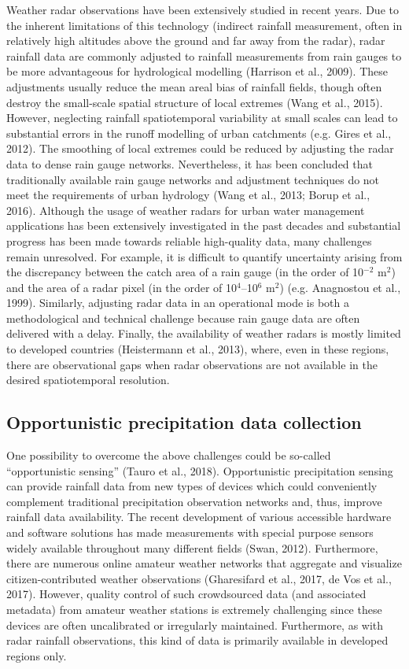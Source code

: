 \documentclass{ctuthesis}\usepackage[]{graphicx}\usepackage[]{color}
\begin{document}
Weather radar observations have been extensively studied in recent years. Due to the inherent limitations of this technology (indirect rainfall measurement, often in relatively high altitudes above the ground and far away from the radar), radar rainfall data are commonly adjusted to rainfall measurements from rain gauges to be more advantageous for hydrological modelling (Harrison et al., 2009). These adjustments usually reduce the mean areal bias of rainfall fields, though often destroy the small-scale spatial structure of local extremes (Wang et al., 2015). However, neglecting rainfall spatiotemporal variability at small scales can lead to substantial errors in the runoff modelling of urban catchments (e.g. Gires et al., 2012). The smoothing of local extremes could be reduced by adjusting the radar data to dense rain gauge networks. Nevertheless, it has been concluded that traditionally available rain gauge networks and adjustment techniques do not meet the requirements of urban hydrology (Wang et al., 2013; Borup et al., 2016). Although the usage of weather radars for urban water management applications has been extensively investigated in the past decades and substantial progress has been made towards reliable high-quality data, many challenges remain unresolved. For example, it is difficult to quantify uncertainty arising from the discrepancy between the catch area of a rain gauge (in the order of 10$^{-2}$ m$^2$) and the area of a radar pixel (in the order of 10$^4$--10$^6$ m$^2$) (e.g. Anagnostou et al., 1999). Similarly, adjusting radar data in an operational mode is both a methodological and technical challenge because rain gauge data are often delivered with a delay. Finally, the availability of weather radars is mostly limited to developed countries (Heistermann et al., 2013), where, even in these regions, there are observational gaps when radar observations are not available in the desired spatiotemporal resolution.


\subsection{Opportunistic precipitation data collection}

One possibility to overcome the above challenges could be so-called \enquote{opportunistic sensing} (Tauro et al., 2018). Opportunistic precipitation sensing can provide rainfall data from new types of devices which could conveniently complement traditional precipitation observation networks and, thus, improve rainfall data availability. The recent development of various accessible hardware and software solutions has made measurements with special purpose sensors widely available throughout many different fields (Swan, 2012). Furthermore, there are numerous online amateur weather networks that aggregate and visualize citizen-contributed weather observations (Gharesifard et al., 2017, de Vos et al., 2017). However, quality control of such crowdsourced data (and associated metadata) from amateur weather stations is extremely challenging since these devices are often uncalibrated or irregularly maintained. Furthermore, as with radar rainfall observations, this kind of data is primarily available in developed regions only.
\end{document}
